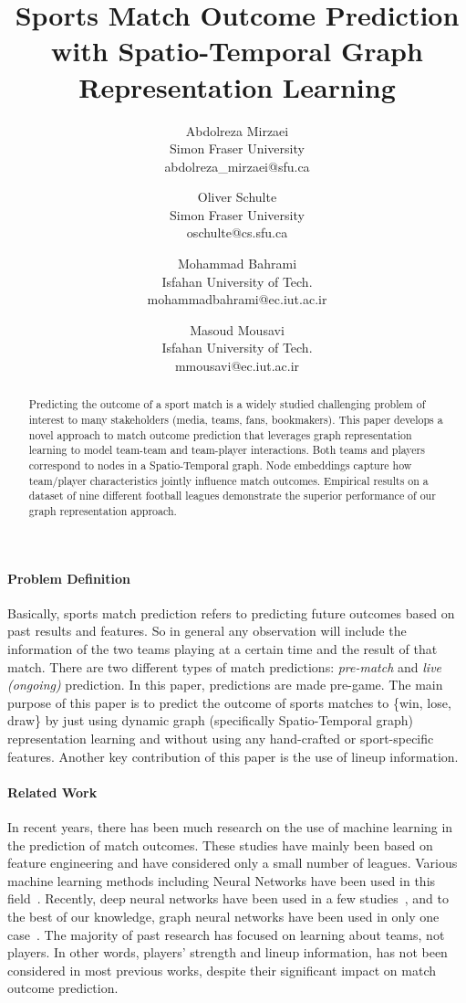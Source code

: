 \documentclass{article}
\title{Sports Match Outcome Prediction with Spatio-Temporal Graph Representation Learning }
\author{Abdolreza Mirzaei\\
        Simon Fraser University \\
        abdolreza\_mirzaei@sfu.ca 
        \and Oliver Schulte\\
        Simon Fraser University \\oschulte@cs.sfu.ca \and
        Mohammad Bahrami\\
        Isfahan University of Tech.\\
        mohammadbahrami@ec.iut.ac.ir \and
        Masoud Mousavi\\
        Isfahan University of Tech.\\
        mmousavi@ec.iut.ac.ir}
\date{}
\begin{document}
\maketitle

\begin{abstract}
Predicting the outcome of a sport match is a widely studied challenging problem of interest to many stakeholders (media, teams, fans, bookmakers). This paper develops a novel approach to match outcome prediction that leverages graph representation learning to model team-team and team-player interactions. Both teams and players correspond to nodes in a Spatio-Temporal graph. Node embeddings capture how team/player characteristics jointly influence match outcomes.
Empirical results on a dataset of nine different football leagues demonstrate the superior performance of our graph representation approach. 
\end{abstract}

\paragraph{Problem Definition}
Basically, sports match prediction refers to predicting future outcomes based on past results and features. So in general any observation will include the information of the  two teams playing at a certain time and the result of that match. There are two different types of match predictions: {\em pre-match} and {\em live (ongoing)} prediction. In this paper, predictions are made pre-game. 
The main purpose of this paper is to predict the outcome of sports matches to \{win, lose, draw\} by just using dynamic graph (specifically Spatio-Temporal graph) representation learning and without using any hand-crafted or sport-specific features.
Another key contribution of this paper is the use of lineup information. 


\paragraph{Related Work} 

In recent years, there has been much research on the use of machine learning in the prediction of match outcomes.
These studies have mainly been based on feature engineering and have considered only a small number of leagues. Various machine learning methods including Neural Networks have been used in this field~\cite{hucaljuk2011predicting}\cite{tax2015predicting}\cite{prasetio2016predicting}\cite{constantinou2019dolores}\cite{berrar2019incorporating}\cite{hubavcek2019learning}. 
Recently, deep neural networks have been used in a few studies~\cite{danisik2018football}\cite{nyquist2017football}\cite{Pereverzeva2021PredictingSM}, and to the best of our knowledge, graph neural networks have been used in only one case~\cite{Pereverzeva2021PredictingSM}.
The majority of past research has focused on learning about teams, not players. In other words, players’ strength and lineup information, has not been considered in most previous works, despite their significant impact on match outcome prediction. 
\end{document}
